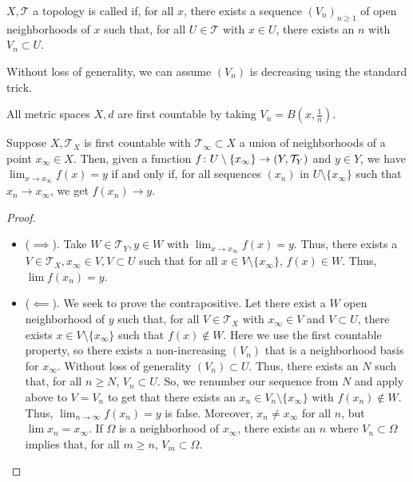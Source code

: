 \documentclass[11pt,leqno,oneside]{amsbook}
\numberwithin{thm}{section}
\newcommand{\Top}{\mathcal{T}} %
\begin{document}
\begin{defn}
  \(X,\Top\) a topology is called  if, for all
  \(x\), there exists a sequence \((V_n)_{n \geq 1}\) of open
  neighborhoods of \(x\) such that, for all \(U \in \Top\) with \(x
  \in U\), there exists an \(n\) with \(V_n \subset U\). 
\end{defn}
Without loss of generality, we can assume \((V_n)\) is decreasing
using the standard trick.
\begin{example}
  All metric spaces \(X,d\) are first countable by taking \(V_n =
  B(x,\frac{1}{n})\). 
\end{example}
\begin{prop}
  Suppose \(X, \Top_X\) is first countable with \(\Top_\infty \subset
  X\) a union of neighborhoods of a point \(x_\infty \in X\). Then,
  given a function \(f \from U \setminus \{x_\infty\} \to (Y,
  \Top_Y)\) and \(y \in Y\), we have \(\lim_{x \to x_\infty} f(x) = y\)
  if and only if, for all sequences \((x_n)\) in \(U \setminus
  \{x_\infty\}\) such that \(x_n \to x_\infty\), we get \(f(x_n) \to y\).
\end{prop}
\begin{proof}
  \begin{itemize}
  \item (\(\implies\)). Take \(W \in \Top_Y, y \in W\) with \(\lim_{x
      \to x_\infty} f(x) = y\). Thus, there exists a \(V \in \Top_X,
    x_\infty \in V, V \subset U\) such that for all \(x \in V
    \setminus \{x_\infty\}\), \(f(x) \in W\). Thus, \(\lim f(x_n) =
    y\).
  \item (\(\impliedby\)). We seek to prove the contrapositive. Let
    there exist a \(W\) open neighborhood of \(y\) such that, for all
    \(V \in \Top_X\) with \(x_\infty \in V\) and \(V \subset U\),
    there exists \(x \in V \setminus \{x_\infty\}\) such that \(f(x)
    \not \in W\). Here we use the first countable property, so there
    exists a non-increasing \((V_n)\) that is a neighborhood basis for
    \(x_\infty\). Without loss of generality \((V_n) \subset
    U\). Thus, there exists an \(N\) such that, for all \(n \geq N\),
    \(V_n \subset U\). So, we renumber our sequence from \(N\) and
    apply above to \(V = V_n\) to get that there exists an \(x_n \in
    V_n \setminus \{x_\infty\}\) with \(f(x_n) \not \in W\). Thus,
    \(\lim_{n \to \infty} f(x_n) = y\) is false. Moreover, \(x_n \neq
    x_\infty\) for all \(n\), but \(\lim x_n = x_\infty\). If
    \(\Omega\) is a neighborhood of \(x_\infty\), there exists an
    \(n\) where \(V_n \subset \Omega\) implies that, for all \(m \geq
    n\), \(V_m \subset \Omega\). 
  \end{itemize}
\end{proof}
\end{document}

